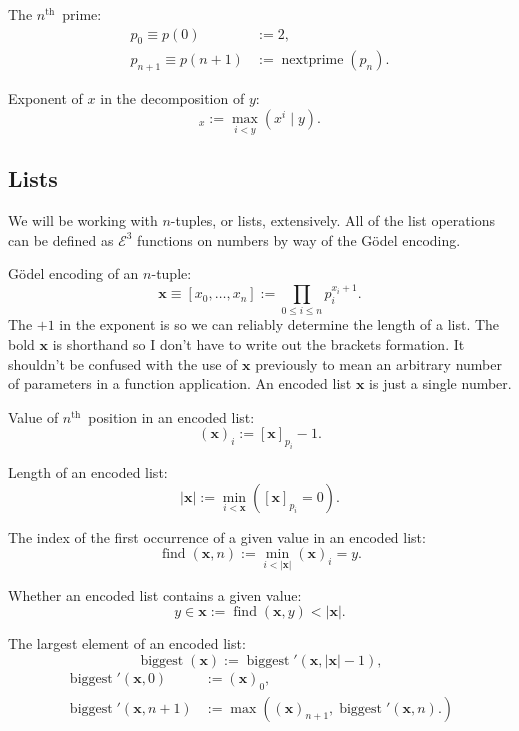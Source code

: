 \documentclass[a4paper]{article}
\newcommand{\grz}[1]{$\mathcal{E}^{#1}$}	%
\newcommand{\nth}{$n^{\textrm{th}}$~}	%
\newcommand{\xvec}{\mathbf{x}}	%
\newcommand{\recur}[1]{\begin{equation} \begin{split} #1 \end{split} \end{equation}}	%
\newcommand{\recurN}[1]{\begin{equation*} \begin{split} #1 \end{split} \end{equation*}}	%
\theoremstyle{plain}
\theoremstyle{definition}
\begin{document}
The \nth prime:
\recur{
	p_0 \equiv p(0) &:= 2,		\\
	p_{n+1} \equiv p(n+1) &:= \operatorname{nextprime} (p_n).
}

Exponent of $x$ in the decomposition of $y$:
\begin{equation} [y]_x := \max_{i < y} \left( x^i \mid y \right). \end{equation}

\subsection{Lists}\label{lists}

We will be working with $n$-tuples, or lists, extensively. All of the list operations can be defined as \grz{3} functions on numbers by way of the G\"odel encoding.

G\"odel encoding of an $n$-tuple:
\begin{equation} \xvec \equiv [x_0, \dots, x_n] := \prod_{0 \leq i \leq n} p_i^{x_i+1}. \end{equation}
The $+1$ in the exponent is so we can reliably determine the length of a list. The bold $\xvec$ is shorthand so I don't have to write out the brackets formation. It shouldn't be confused with the use of $\xvec$ previously to mean an arbitrary number of parameters in a function application. An encoded list $\xvec$ is just a single number.

Value of \nth position in an encoded list:
\begin{equation} (\xvec)_i := [\xvec]_{p_i} - 1. \end{equation}

Length of an encoded list:
\begin{equation} |\xvec| := \min_{i < \xvec} \left([\xvec]_{p_i} = 0  \right).\end{equation}

The index of the first occurrence of a given value in an encoded list:
\begin{equation} \operatorname{find}(\xvec,n) := \min_{i < |\xvec|} (\xvec)_i = y. \end{equation}

Whether an encoded list contains a given value:
\begin{equation} y \in \xvec := \operatorname{find}(\xvec,y) < |\xvec|. \end{equation}

The largest element of an encoded list:
\begin{equation} \operatorname{biggest}(\xvec) := \operatorname{biggest}'(\xvec,|\xvec|-1), \end{equation}
\recurN{
	\operatorname{biggest}'(\xvec,0) &:= (\xvec)_0, \\ 
	\operatorname{biggest}'(\xvec,n+1) &:= \max \left ( (\xvec)_{n+1},\operatorname{biggest}'(\xvec,n). \right )
}
\end{document}
